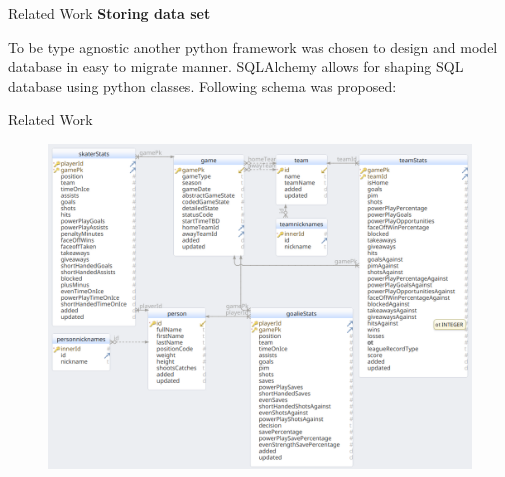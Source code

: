 \begin{frame}{Related Work}
    \textbf{Storing data set}
    \vspace{2em}
   
    To be type agnostic another python framework was chosen to design and model database in easy to migrate manner. SQLAlchemy allows for shaping SQL database using python classes. Following schema was proposed:
\end{frame}

\begin{frame}{Related Work}
    \begin{figure}[H]
        \includegraphics[height=0.9\textheight]{dbschema}
    \end{figure}
\end{frame}

